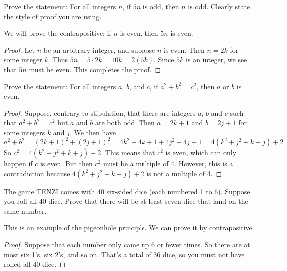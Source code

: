 \begin{questions}
\question Prove the statement: For all integers $n$, if $5n$ is odd, then $n$ is odd.  Clearly state the style of proof you are using.
	\begin{answer}
	We will prove the contrapositive: if $n$ is even, then $5n$ is even.
	  \begin{proof}
	    Let $n$ be an arbitrary integer, and suppose $n$ is even.  Then $n = 2k$ for some integer $k$.  Thus $5n = 5\cdot 2k = 10k = 2(5k)$.  Since $5k$ is an integer, we see that $5n$ must be even.  This completes the proof.
	  \end{proof}

	\end{answer}




\question Prove the statement: For all integers $a$, $b$, and $c$, if $a^2 + b^2 = c^2$, then $a$ or $b$ is even.
	\begin{answer}
	  \begin{proof}
	    Suppose, contrary to stipulation, that there are integers $a$, $b$ and $c$ such that $a^2 + b^2 = c^2$ but $a$ and $b$ are both odd.  Then $a = 2k+1$ and $b = 2j + 1$ for some integers $k$ and $j$.  We then have
	    \[a^2 + b^2 = (2k+1)^2 + (2j+1)^2 = 4k^2 + 4k + 1 + 4j^2 + 4j + 1 = 4(k^2 + j^2 + k + j) + 2\]
	    So $c^2 = 4(k^2 + j^2 + k + j) + 2$.  This means that $c^2$ is even, which can only happen if $c$ is even.  But then $c^2$ must be a multiple of 4.  However, this is a contradiction because $4(k^2 + j^2 + k + j) + 2$ is not a multiple of 4.
	  \end{proof}

	\end{answer}




\question The game TENZI comes with 40 six-sided dice (each numbered 1 to 6).  Suppose you roll all 40 dice.  Prove that there will be at least seven dice that land on the same number.

	\begin{answer}
	This is an example of the pigeonhole principle.  We can prove it by contrapositive.

	\begin{proof}
	Suppose that each number only came up 6 or fewer times.  So there are at most six 1's, six 2's, and so on.  That's a total of 36 dice, so you must not have rolled all 40 dice.
	\end{proof}
	\end{answer}






\end{questions}
